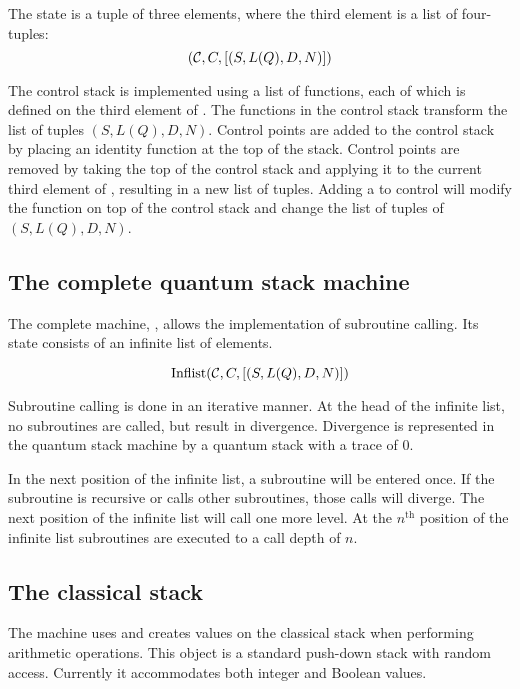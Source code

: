 The \cms{} state is a tuple of three elements, where the third element
is a list of four-tuples:
\begin{equation}
(\mathcal{C}, C , [(S,L(Q),D,N)]) \label{eq:controlmachinestate}
\end{equation}



The control stack is implemented using 
a list of functions, each of which is defined on the third element of
\cms. The functions in the control stack
transform the list of  tuples $(S,L(Q),D,N)$.  Control points are
added to the control stack 
by placing an identity function at the top of
the stack. Control points are removed by taking the top of the control stack
and applying it to the current third element of \cms, resulting in
a new list of tuples.
Adding a \qubit{} to control will modify the function on top of the control
stack
and change the list of tuples of $(S,L(Q),D,N)$.

\subsection{The complete quantum stack machine}\label{subsec:machinestate}

The complete machine, \ms,  allows the  implementation of  subroutine calling.
Its state consists of 
an infinite list of \cms{} elements.

\begin{equation}
\text{Inflist}{(\ensuremath{\mathcal{C}}, C , [(S,L(Q),D,N)])} \label{eq:machinestate}
\end{equation}


Subroutine calling is done in an iterative manner. At the head of the
infinite list, no subroutines are called, but result in divergence.
Divergence is represented in the quantum stack machine by a quantum 
stack with a trace of $0$.

In the next position of the infinite list, a subroutine will be entered once.
If the subroutine
 is recursive or calls other subroutines, those calls will diverge. 
The next position of the infinite list will call one more
level. At the $n^{\mathrm{th}}$ position of the infinite list 
subroutines are executed to a call depth of $n$.

\subsection{The classical stack}\label{subsec:repauxclassicalstack}
The machine uses and creates values
on the classical stack when performing arithmetic operations. 
This object is a standard 
push-down stack with random access.
Currently it accommodates both integer and Boolean values.

